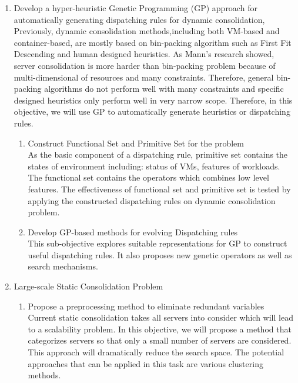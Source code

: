 \begin{enumerate}
	\item  Develop a hyper-heuristic Genetic Programming (GP) approach for automatically generating dispatching rules for dynamic consolidation,
	Previously, dynamic consolidation methods,including both VM-based and container-based, are mostly based on bin-packing algorithm such as First Fit Descending and human designed heuristics. As Mann's research \cite{Mann:2015ua} showed, server consolidation is more harder than bin-packing problem because of multi-dimensional of resources and many constraints. Therefore, general bin-packing algorithms do not perform well with many constraints and specific designed heuristics only perform well in very narrow scope. Therefore, in this objective, we will use GP to automatically generate heuristics or dispatching rules.
	\begin{enumerate}
		\item Construct Functional Set and Primitive Set for the problem \\
		As the basic component of a dispatching rule, primitive set contains the states of environment including: status of VMs, features of workloads. The functional set contains the operators which combines low level features. The effectiveness of functional set and primitive set is tested by applying the constructed dispatching rules on dynamic consolidation problem.

		\item Develop GP-based methods for evolving Dispatching rules \\
		This sub-objective explores suitable representations for GP to construct useful dispatching rules. It also proposes new genetic operators as well as search mechanisms.
	\end{enumerate}

	\item Large-scale Static Consolidation Problem
	\begin{enumerate}
		\item Propose a preprocessing method to eliminate redundant variables \\
		Current static consolidation takes all servers into consider which will lead to a scalability problem. In this objective, we will propose a method that categorizes servers so that only a small number of servers are considered. This approach will dramatically reduce the search space. The potential approaches that can be applied in this task are various clustering methods.
	\end{enumerate}
\end{enumerate}


